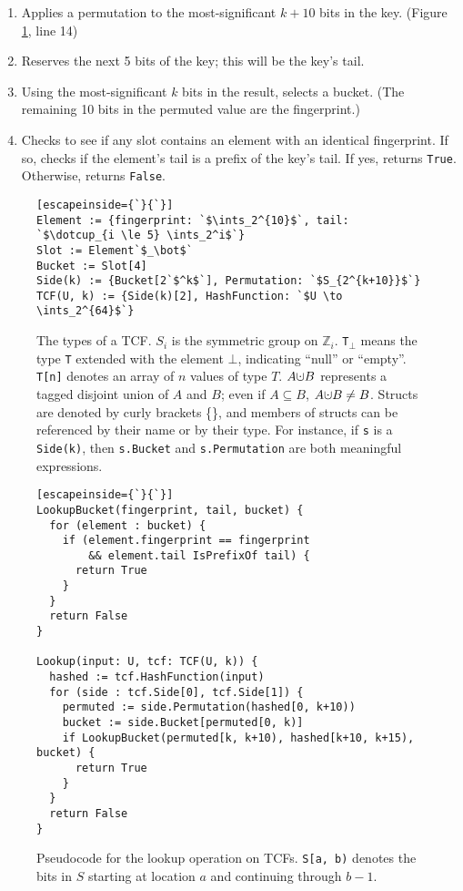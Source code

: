 \documentclass[manuscript,screen,review]{acmart}
\newcommand{\ints}{\mathbb{Z}}
\newcommand{\dotcup}{\ensuremath{\mathaccent\cdot\cup}}
\begin{document}
\begin{enumerate}
\item Applies a permutation to the most-significant $k+10$ bits in the key. (Figure \ref{tcf-lookup}, line 14)
\item Reserves the next 5 bits of the key; this will be the key's tail.
\item Using the most-significant $k$ bits in the result, selects a bucket.
(The remaining 10 bits in the permuted value are the fingerprint.)
\item Checks to see if any slot contains an element with an identical fingerprint.
If so, checks if the element's tail is a prefix of the key's tail.
If yes, returns \verb|True|.
Otherwise, returns \verb|False|.
\end{enumerate}

\begin{figure}

\begin{lstlisting}[escapeinside={`}{`}]
Element := {fingerprint: `$\ints_2^{10}$`, tail: `$\dotcup_{i \le 5} \ints_2^i$`}
Slot := Element`$_\bot$`
Bucket := Slot[4]
Side(k) := {Bucket[2`$^k$`], Permutation: `$S_{2^{k+10}}$`}
TCF(U, k) := {Side(k)[2], HashFunction: `$U \to \ints_2^{64}$`}
\end{lstlisting}
\caption{\protect
  The types of a TCF.
  $S_i$ is the symmetric group on $\ints_i$.
  \texttt{T}$_\bot$ means the type \texttt{T} extended with the element $\bot$, indicating ``null'' or ``empty''.
  \texttt{T[n]} denotes an array of $n$ values of type $T$.
  $A \dotcup B$ represents a tagged disjoint union of $A$ and $B$; even if $A \subseteq B$, $A \dotcup B \ne B$.
  Structs are denoted by curly brackets \{\}, and members of structs can be referenced by their name or by their type.
  For instance, if \texttt{s} is a \texttt{Side(k)}, then \texttt{s.Bucket} and \texttt{s.Permutation} are both meaningful expressions.
}

\end{figure}


\begin{figure}

\begin{lstlisting}[escapeinside={`}{`}]
LookupBucket(fingerprint, tail, bucket) {
  for (element : bucket) {
    if (element.fingerprint == fingerprint
        && element.tail IsPrefixOf tail) {
      return True
    }
  }
  return False
}

Lookup(input: U, tcf: TCF(U, k)) {
  hashed := tcf.HashFunction(input)
  for (side : tcf.Side[0], tcf.Side[1]) {
    permuted := side.Permutation(hashed[0, k+10))
    bucket := side.Bucket[permuted[0, k)]
    if LookupBucket(permuted[k, k+10), hashed[k+10, k+15), bucket) {
      return True
    }
  }
  return False
}
\end{lstlisting}
\caption{\label{tcf-lookup}
Pseudocode for the lookup operation on TCFs.
\texttt{S[a, b)} denotes the bits in $S$ starting at location $a$ and continuing through $b-1$.
}

\end{figure}
\end{document}
